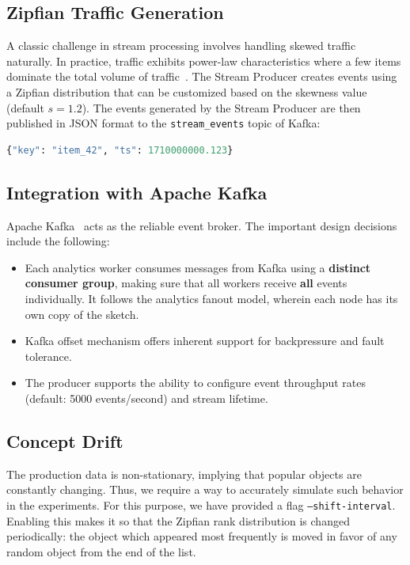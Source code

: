 \subsection{Zipfian Traffic Generation}
A classic challenge in stream processing involves handling skewed traffic naturally. In practice, traffic exhibits power-law characteristics where a few items dominate the total volume of traffic~\cite{zipf}. The Stream Producer creates events using a Zipfian distribution that can be customized based on the skewness value (default $s = 1.2$). The events generated by the Stream Producer are then published in JSON format to the \texttt{stream\_events} topic of Kafka:

\begin{lstlisting}[language=Python, caption=Example format of the event published to Kafka.]
{"key": "item_42", "ts": 1710000000.123}
\end{lstlisting}

\subsection{Integration with Apache Kafka}
Apache Kafka~\cite{kafka} acts as the reliable event broker. The important design decisions include the following:
\begin{itemize}
    \item Each analytics worker consumes messages from Kafka using a \textbf{distinct consumer group}, making sure that all workers receive \textbf{all} events individually. It follows the analytics fanout model, wherein each node has its own copy of the sketch.
    \item Kafka offset mechanism offers inherent support for backpressure and fault tolerance.
    \item The producer supports the ability to configure event throughput rates (default: 5000 events/second) and stream lifetime.
\end{itemize}

\subsection{Concept Drift}
The production data is non-stationary, implying that popular objects are constantly changing. Thus, we require a way to accurately simulate such behavior in the experiments. For this purpose, we have provided a flag \texttt{--shift-interval}. Enabling this makes it so that the Zipfian rank distribution is changed periodically: the object which appeared most frequently is moved in favor of any random object from the end of the list.

